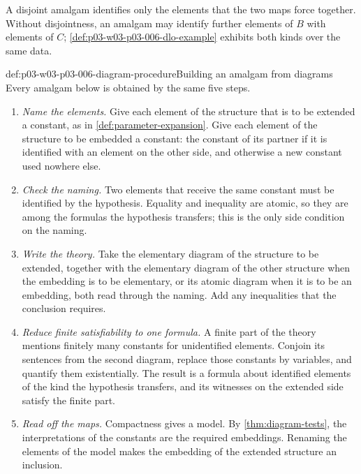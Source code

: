 A disjoint amalgam identifies only the elements that the two maps force
together.  Without disjointness, an amalgam may identify further elements of
\(B\) with elements of \(C\);
\cref{def:p03-w03-p03-006-dlo-example} exhibits both kinds over the same
data.

\begin{hbmethod}{def:p03-w03-p03-006-diagram-procedure}{Building an amalgam from diagrams}
Every amalgam below is obtained by the same five steps.
\begin{enumerate}
  \item \emph{Name the elements.}  Give each element of the structure that
        is to be extended a constant, as in \cref{def:parameter-expansion}.
        Give each element of the structure to be embedded a constant:
        the constant of its partner if it is identified with an element on
        the other side, and otherwise a new constant used nowhere else.
  \item \emph{Check the naming.}  Two elements that receive the same
        constant must be identified by the hypothesis.  Equality and
        inequality are atomic, so they are among the formulas the
        hypothesis transfers; this is the only side condition on the
        naming.
  \item \emph{Write the theory.}  Take the elementary diagram of the
        structure to be extended, together with the elementary diagram of
        the other structure when the embedding is to be elementary, or its
        atomic diagram when it is to be an embedding, both read through the
        naming.  Add any inequalities that the conclusion requires.
  \item \emph{Reduce finite satisfiability to one formula.}  A finite part
        of the theory mentions finitely many constants for unidentified
        elements.  Conjoin its sentences from the second diagram,
        replace those constants by variables, and quantify them
        existentially.  The result is a formula about identified elements
        of the kind the hypothesis transfers, and its witnesses on the
        extended side satisfy the finite part.
  \item \emph{Read off the maps.}  Compactness gives a model.  By
        \cref{thm:diagram-tests}, the interpretations of the constants are
        the required embeddings.  Renaming the elements of the model makes
        the embedding of the extended structure an inclusion.
\end{enumerate}
\end{hbmethod}

